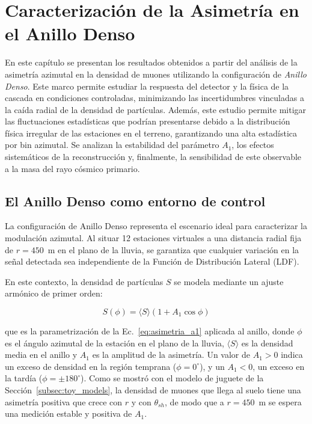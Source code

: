 

\chapter{Caracterización de la Asimetría en el Anillo Denso}
\label{sec:cap_anillo_denso}

En este capítulo se presentan los resultados obtenidos a partir del análisis de la asimetría azimutal en la densidad de muones utilizando la configuración de \textit{Anillo Denso}. Este marco permite estudiar la respuesta del detector y la física de la cascada en condiciones controladas, minimizando las incertidumbres vinculadas a la caída radial de la densidad de partículas. Además, este estudio permite mitigar las fluctuaciones estadísticas que podrían presentarse debido a la distribución física irregular de las estaciones en el terreno, garantizando una alta estadística por bin azimutal. Se analizan la estabilidad del parámetro $A_1$, los efectos sistemáticos de la reconstrucción y, finalmente, la sensibilidad de este observable a la masa del rayo cósmico primario.

\section{El Anillo Denso como entorno de control}
\label{subsec:entorno_control}

La configuración de Anillo Denso representa el escenario ideal para caracterizar la modulación azimutal. Al situar 12 estaciones virtuales a una distancia radial fija de $r = 450$~m en el plano de la lluvia, se garantiza que cualquier variación en la señal detectada sea independiente de la Función de Distribución Lateral (LDF). 

En este contexto, la densidad de partículas $S$ se modela mediante un ajuste armónico de primer orden:

\begin{equation}
	S(\phi) = \langle S \rangle (1 + A_1 \cos\phi)
	\label{eq:ajuste_armonico}
\end{equation}

que es la parametrización de la Ec.~\ref{eq:asimetria_a1} aplicada al anillo, donde $\phi$ es el ángulo azimutal de la estación en el plano de la lluvia, $\langle S \rangle$ es la densidad media en el anillo y $A_1$ es la amplitud de la asimetría. Un valor de $A_1 > 0$ indica un exceso de densidad en la región temprana ($\phi = 0^\circ$), y un $A_1 < 0$, un exceso en la tardía ($\phi = \pm 180^\circ$). Como se mostró con el modelo de juguete de la Sección~\ref{subsec:toy_models}, la densidad de muones que llega al suelo tiene una asimetría positiva que crece con $r$ y con $\theta_{sh}$, de modo que a $r = 450$~m se espera una medición estable y positiva de $A_1$.

